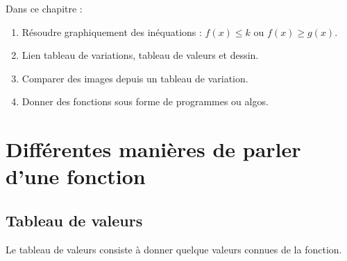 
Dans ce chapitre :
\begin{enumerate}
    \item
        Résoudre graphiquement des inéquations : \( f(x)\leq k\) ou \( f(x)\geq g(x)\).
    \item
        Lien tableau de variations, tableau de valeurs et dessin.
    \item
        Comparer des images depuis un tableau de variation.
    \item
        Donner des fonctions sous forme de programmes ou algos.
\end{enumerate}

\section{Différentes manières de parler d'une fonction}

\subsection{Tableau de valeurs}

Le tableau de valeurs consiste à donner quelque valeurs connues de la fonction.

